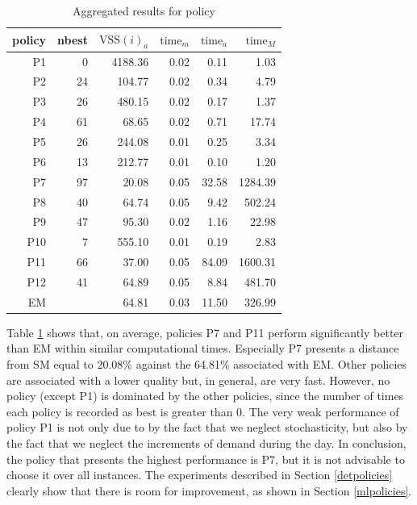 \documentclass[preprint,11pt,authoryear]{elsarticle}
\begin{document}
\begin{table}[H]
\centering
\begin{tabular}{rrrrrr}
\hline
policy &  nbest & $\text{VSS}(i)_a$ & $\text{time}_m$ & $\text{time}_a$ & $\text{time}_M$ \\
\hline
P1   & 0     & 4188.36 & 0.02    & 0.11    & 1.03    \\
P2  & 24    & 104.77  & 0.02    & 0.34    & 4.79    \\
P3  & 26    & 480.15  & 0.02    & 0.17    & 1.37    \\
P4    & 61    & 68.65  & 0.02    & 0.71    & 17.74   \\
P5   & 26    & 244.08  & 0.01    & 0.25    & 3.34    \\
P6   & 13    & 212.77  & 0.01    & 0.10     & 1.20     \\
P7   & 97    & 20.08  & 0.05    & 32.58   & 1284.39 \\
P8    & 40    & 64.74  & 0.05    & 9.42    & 502.24  \\
P9    & 47    & 95.30  & 0.02    & 1.16    & 22.98   \\
P10  & 7     & 555.10  & 0.01    & 0.19    & 2.83    \\
P11   & 66    & 37.00  & 0.05    & 84.09   & 1600.31 \\
P12   & 41    & 64.89  & 0.05    & 8.84    & 481.70 \\
\hline
EM  &  & 64.81 & 0.03 & 11.50 & 326.99\\ 
\end{tabular}
\caption{Aggregated results for policy}\label{tab:results_policies}
\end{table}

Table \ref{tab:results_policies} shows that, on average, policies P7 and P11 perform significantly better than EM within similar computational times. Especially P7 presents a distance from SM equal to 20.08\% against the 64.81\% associated with EM. Other policies are associated with a lower quality but, in general, are very fast. However, no policy (except P1) is dominated by the other policies, since 
the number of times each policy is recorded as best is greater than 0. The very weak performance of policy P1 is not only due to by the fact that we neglect stochasticity, but also by the fact that we neglect the increments of demand during the day.
In conclusion, the policy that presents the highest performance is P7, but it is not advisable to choose it over all instances. The experiments described in Section \ref{detpolicies} clearly show that there is room for improvement, as shown in Section \ref{mlpolicies}.    
\end{document}
